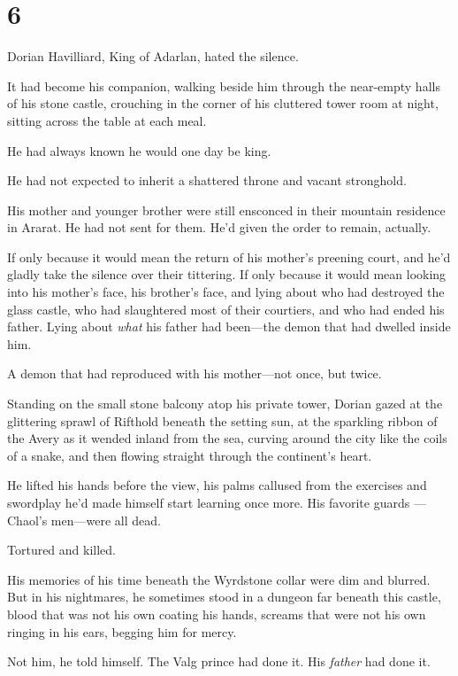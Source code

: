 
\chapter{6}

Dorian Havilliard, King of Adarlan, hated the silence.

It had become his companion, walking beside him through the near-empty halls of his stone castle, crouching in the corner of his cluttered tower room at night, sitting across the table at each meal.

He had always known he would one day be king.

He had not expected to inherit a shattered throne and vacant stronghold.

His mother and younger brother were still ensconced in their mountain residence in Ararat. He had not sent for them. He'd given the order to remain, actually.

If only because it would mean the return of his mother's preening court, and he'd gladly take the silence over their tittering. If only because it would mean looking into his mother's face, his brother's face, and lying about who had destroyed the glass castle, who had slaughtered most of their courtiers, and who had ended his father. Lying about
\emph{what} his father had been---the demon that had dwelled inside him.

A demon that had reproduced with his mother---not once, but twice.

Standing on the small stone balcony atop his private tower, Dorian gazed at the glittering sprawl of Rifthold beneath the setting sun, at the sparkling ribbon of the Avery as it wended inland from the sea, curving around the city like the coils of a snake, and then flowing straight through the continent's heart.

He lifted his hands before the view, his palms callused from the exercises and swordplay he'd made himself start learning once more. His favorite guards ---Chaol's men---were all dead.

Tortured and killed.

His memories of his time beneath the Wyrdstone collar were dim and blurred. But in his nightmares, he sometimes stood in a dungeon far beneath this castle, blood that was not his own coating his hands, screams that were not his own ringing in his ears, begging him for mercy.

Not him, he told himself. The Valg prince had done it. His \emph{father}
had done it.

